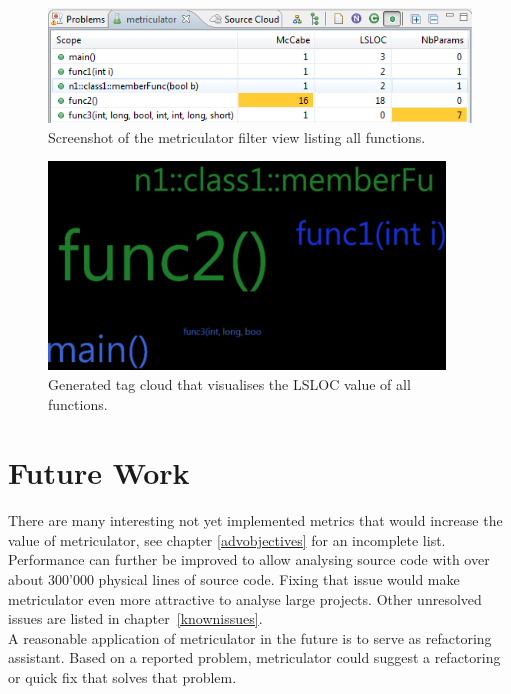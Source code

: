 \documentclass[11pt,a4paper,oneside]{scrreprt}
\begin{document}
\begin{figure}[th]
\begin{center}
\includegraphics[]{figures/filtered_functions_view.png}
\end{center}
\caption{Screenshot of the metriculator filter view listing all functions.}
\label{fig:metriculator_filter}
\end{figure}

\begin{figure}[th]
\begin{center}
\includegraphics{figures/tag_cloud_lsloc.png} 
\end{center} 
\caption{Generated tag cloud that visualises the LSLOC value of all functions.}
\label{fig:tagcloud}
\end{figure}

\section*{Future Work}
There are many interesting not yet implemented metrics that would increase the value of metriculator, see chapter \ref{advobjectives} for an incomplete list.\\
Performance can further be improved to allow analysing source code with over about 300'000 physical lines of source code. Fixing that issue would make metriculator even more attractive to analyse large projects. Other unresolved issues are listed in chapter~\ref{knownissues}.\\
A reasonable application of metriculator in the future is to serve as refactoring assistant. Based on a reported problem, metriculator could suggest a refactoring or quick fix that solves that problem.
\end{document}
